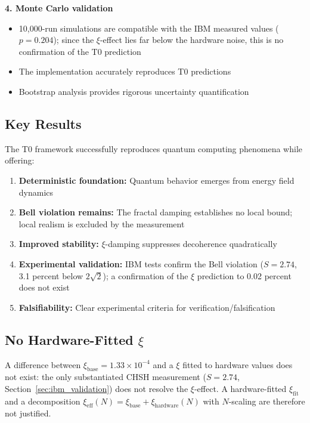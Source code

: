 \textbf{4. Monte Carlo validation}
\begin{itemize}
	\item 10,000-run simulations are compatible with the IBM measured values ($p = 0.204$); since the $\xi$-effect lies far below the hardware noise, this is no confirmation of the T0 prediction
	\item The implementation accurately reproduces T0 predictions
	\item Bootstrap analysis provides rigorous uncertainty quantification
\end{itemize}

\subsection{Key Results}

\begin{keyresult}
	The T0 framework successfully reproduces quantum computing phenomena while offering:
	\begin{enumerate}
		\item \textbf{Deterministic foundation:} Quantum behavior emerges from energy field dynamics
		\item \textbf{Bell violation remains:} The fractal damping establishes no local bound; local realism is excluded by the measurement
		\item \textbf{Improved stability:} $\xi$-damping suppresses decoherence quadratically
		\item \textbf{Experimental validation:} IBM tests confirm the Bell violation ($S = 2.74$, 3.1 percent below $2\sqrt{2}$); a confirmation of the $\xi$ prediction to 0.02 percent does not exist
		\item \textbf{Falsifiability:} Clear experimental criteria for verification/falsification
	\end{enumerate}
\end{keyresult}

\subsection{No Hardware-Fitted $\xi$}

A difference between $\xi_{\text{base}} = 1.33 \times 10^{-4}$ and a $\xi$ fitted to hardware values does not exist: the only substantiated CHSH measurement ($S = 2.74$, Section~\ref{sec:ibm_validation}) does not resolve the $\xi$-effect. A hardware-fitted $\xi_{\text{fit}}$ and a decomposition $\xi_{\text{eff}}(N) = \xi_{\text{base}} + \xi_{\text{hardware}}(N)$ with $N$-scaling are therefore not justified.

